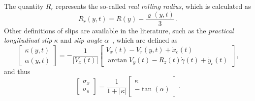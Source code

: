 %
The quantity $R_r$ represents the so-called \emph{real rolling radius}, which is calculated as
%
\begin{equation}
  R_r(y,t) = R(y) - \dfrac{\varrho(y,t)}{3} \, \text{.}
\end{equation}
%
Other definitions of slips are available in the literature, such as the \emph{practical longitudinal slip} $\kappa$ and \emph{slip angle} $\alpha$~\cite{pacejka2012tire}, which are defined as
%
\begin{equation}
  \begin{bmatrix}
    \kappa(y,t) \\[0.2em]
    \alpha(y,t)
  \end{bmatrix}
  =
  -\dfrac{1}{|V_x(t)|}
  \begin{bmatrix}
    V_x(t) - V_r(y,t) + \dot{x}_c(t) \\[0.2em]
    \arctan{V_y(t) - R_z(t)\dot{\gamma}(t) + \dot{y}_c(t)}
  \end{bmatrix} \, \text{,}
\end{equation}
%
and thus
%
\begin{equation}
  \begin{bmatrix}
    \sigma_x \\[0.2em]
    \sigma_y
  \end{bmatrix}
  =
  \dfrac{1}{1 + |\kappa|}
  \begin{bmatrix}
    \kappa \\[0.2em]
    -\tan(\alpha)
  \end{bmatrix} \, \text{.}
\end{equation}

